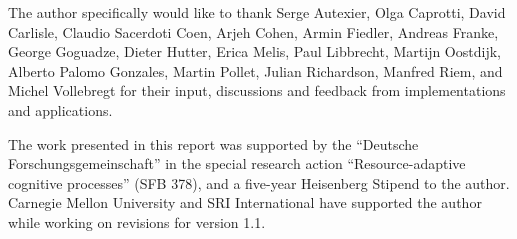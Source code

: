 The author specifically would like to thank Serge Autexier, Olga Caprotti, David
Carlisle, Claudio Sacerdoti Coen, Arjeh Cohen, Armin Fiedler, Andreas Franke,
George Goguadze, Dieter Hutter, Erica Melis, Paul Libbrecht, Martijn Oostdijk,
Alberto Palomo Gonzales, Martin Pollet, Julian Richardson, Manfred Riem, and
Michel Vollebregt for their input, discussions and feedback from implementations
and applications.

The work presented in this report was supported by the ``Deutsche
Forschungsgemeinschaft'' in the special research action ``Resource-adaptive
cognitive processes'' (SFB 378), and a five-year Heisenberg Stipend to the author.
Carnegie Mellon University and SRI International have supported the author while
working on revisions for version 1.1.


